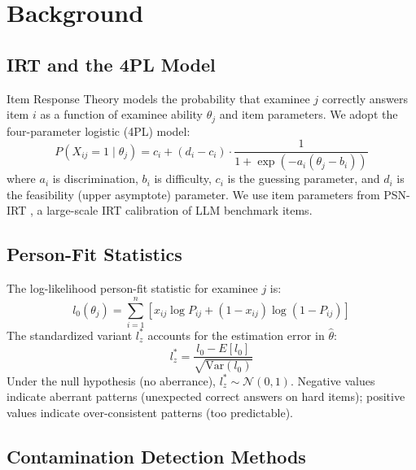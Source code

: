 \documentclass[11pt,a4paper]{article}
\begin{document}
\section{Background}

\subsection{IRT and the 4PL Model}

Item Response Theory models the probability that examinee $j$ correctly answers item $i$ as a function of examinee ability $\theta_j$ and item parameters.
We adopt the four-parameter logistic (4PL) model:
\begin{equation}
    P(X_{ij}=1 \mid \theta_j) = c_i + (d_i - c_i) \cdot \frac{1}{1 + \exp(-a_i(\theta_j - b_i))}
\end{equation}
where $a_i$ is discrimination, $b_i$ is difficulty, $c_i$ is the guessing parameter, and $d_i$ is the feasibility (upper asymptote) parameter.
We use item parameters from PSN-IRT \citep{psnirt2025}, a large-scale IRT calibration of LLM benchmark items.

\subsection{Person-Fit Statistics}

The log-likelihood person-fit statistic for examinee $j$ is:
\begin{equation}
    l_0(\theta_j) = \sum_{i=1}^{n} \left[ x_{ij} \log P_{ij} + (1 - x_{ij}) \log(1 - P_{ij}) \right]
\end{equation}
The standardized variant $l_{z}^{*}$ \citep{snijders2001} accounts for the estimation error in $\hat{\theta}$:
\begin{equation}
    l_{z}^{*} = \frac{l_0 - E[l_0]}{\sqrt{\text{Var}(l_0)}}
\end{equation}
Under the null hypothesis (no aberrance), $l_{z}^{*} \sim \mathcal{N}(0,1)$.
Negative values indicate aberrant patterns (unexpected correct answers on hard items); positive values indicate over-consistent patterns (too predictable).

\subsection{Contamination Detection Methods}
\end{document}
